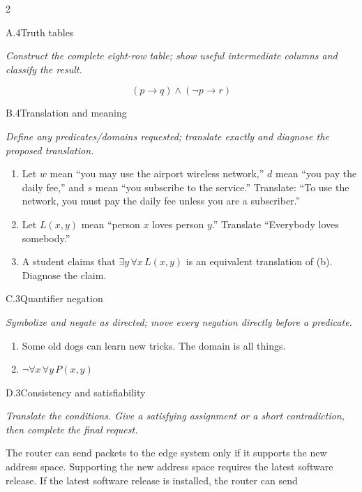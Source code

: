 \documentclass[9pt]{extarticle}
\begin{document}
\CoreWorkArea
\FormBreak
{}
\begin{multicols}{2}
\begin{CoreProblem}{A.4}{Truth tables}
{\scriptsize\textit{Construct the complete eight-row table; show useful intermediate columns and classify the result.}\par}
\[
  (p\to q)\land(\neg p\to r)
\]
\end{CoreProblem}
\begin{CoreProblem}{B.4}{Translation and meaning}
{\scriptsize\textit{Define any predicates/domains requested; translate exactly and diagnose the proposed translation.}\par}
\begin{enumerate}[label=(\alph*)]
  \item Let $w$ mean ``you may use the airport wireless network,'' $d$ mean
        ``you pay the daily fee,'' and $s$ mean ``you subscribe to the
        service.'' Translate: ``To use the network, you must pay the daily fee
        unless you are a subscriber.''
  \item Let $L(x,y)$ mean ``person $x$ loves person $y$.'' Translate
        ``Everybody loves somebody.''
  \item A student claims that $\exists y\,\forall x\,L(x,y)$ is an equivalent
        translation of (b). Diagnose the claim.
\end{enumerate}
\end{CoreProblem}
\begin{CoreProblem}{C.3}{Quantifier negation}
{\scriptsize\textit{Symbolize and negate as directed; move every negation directly before a predicate.}\par}
\begin{enumerate}[label=(\alph*)]
  \item Some old dogs can learn new tricks. The domain is all things.
  \item $\neg\forall x\,\forall y\,P(x,y)$
\end{enumerate}
\end{CoreProblem}
\columnbreak
\begin{CoreProblem}{D.3}{Consistency and satisfiability}
{\scriptsize\textit{Translate the conditions. Give a satisfying assignment or a short contradiction, then complete the final request.}\par}
The router can send packets to the edge system only if it supports the new
address space. Supporting the new address space requires the latest software
release. If the latest software release is installed, the router can send

\end{CoreProblem}
\end{multicols}
\end{document}
